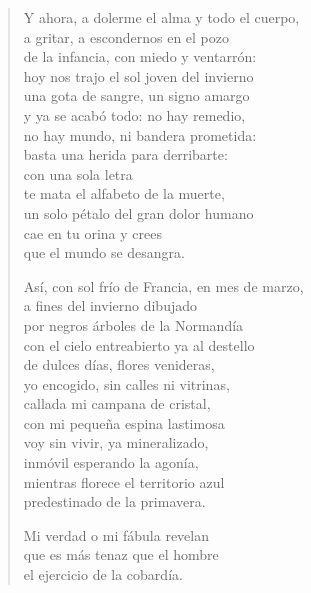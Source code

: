 \documentclass[12pt]{article}
\begin{document}
\clearpage
{}
\begin{verse}

Y ahora, a dolerme el alma y todo el cuerpo,\\
a gritar, a escondernos en el pozo\\
de la infancia, con miedo y ventarrón:\\
hoy nos trajo el sol joven del invierno\\
una gota de sangre, un signo amargo\\
y ya se acabó todo: no hay remedio,\\
no hay mundo, ni bandera prometida:\\
basta una herida para derribarte:\\
con una sola letra\\
te mata el alfabeto de la muerte,\\
un solo pétalo del gran dolor humano\\
cae en tu orina y crees\\
que el mundo se desangra.  

Así, con sol frío de Francia, en mes de marzo,\\
a fines del invierno dibujado\\
por negros árboles de la Normandía\\
con el cielo entreabierto ya al destello\\
de dulces días, flores venideras,\\
yo encogido, sin calles ni vitrinas,\\
callada mi campana de cristal,\\
con mi pequeña espina lastimosa\\
voy sin vivir, ya mineralizado,\\
inmóvil esperando la agonía,\\
mientras florece el territorio azul\\
predestinado de la primavera.  

Mi verdad o mi fábula revelan\\
que es más tenaz que el hombre\\
el ejercicio de la cobardía.  

\end{verse}
\end{document}

